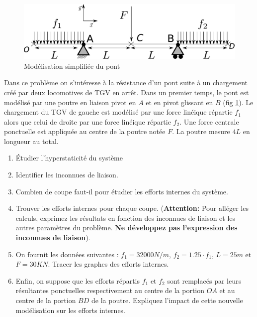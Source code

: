 \documentclass[lecture.tex]{subfiles}
\begin{document}

\begin{figure}[h]
  \centering
  \includegraphics[scale=0.6]{Poutre_Biappuie_V2.pdf}
  \caption{Modélisation simplifiée du pont}
  \label{Poutre_BiApp}
\end{figure}

Dans ce problème on s'intéresse à la résistance d'un pont suite à un chargement créé par deux locomotives de TGV en arrêt. Dans un premier temps, le pont est modélisé par une poutre en liaison pivot en $A$ et en pivot glissant en $B$ (fig \ref{Poutre_BiApp}). Le chargement du TGV de gauche est modélisé par une force linéique répartie $f_1$ alors que celui de droite par une force linéique répartie $f_2$. Une force centrale ponctuelle est appliquée au centre de la poutre notée $F$. La poutre mesure $4L$ en longueur au total.

\begin{enumerate}
  \item Étudier l'hyperstaticité du système
  \item Identifier les inconnues de liaison.
  \item Combien de coupe faut-il pour étudier les efforts internes du système.
  \item Trouver les efforts internes pour chaque coupe. (\textbf{Attention:} Pour alléger les calculs, exprimez les résultats en fonction des inconnues de liaison et les autres paramètres du problème. \textbf{Ne développez pas l'expression des inconnues de liaison}).
  \item On fournit les données suivantes : $f_1=32000 N/m$, $f_2=1.25\cdot f_1$, $L=25m$ et $F=30KN$. Tracer les graphes des efforts internes.
  \item Enfin, on suppose que les efforts répartis $f_1$ et $f_2$ sont remplacés par leurs résultantes ponctuelles respectivement au centre de la portion $OA$ et au centre de la portion $BD$ de la poutre. Expliquez l'impact de cette nouvelle modélisation sur les efforts internes.
\end{enumerate}

\finexercice
\end{document}
